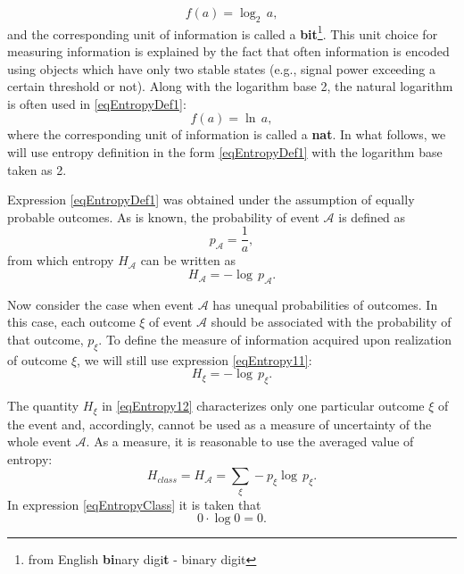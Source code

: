 \begin{equation}
f\left(a\right) = \log_2\,a,
\label{eqEntropyDefBit}
\end{equation}
and the corresponding unit of information is called a {\bf bit}\footnote{from
English {\bf bi}nary digi{\bf t} - binary digit}. This
unit choice for measuring information
is explained by the fact that often information is encoded using objects
which have only two stable states (e.g., signal power exceeding
a certain threshold or not). Along with the logarithm base 2, the natural logarithm is often used in \eqref{eqEntropyDef1}:
\begin{equation}
f\left(a\right) = \ln\,a,
\label{eqEntropyDefNat}
\end{equation}
where the corresponding unit of information is called a {\bf nat}. In
what follows, we will use entropy definition in the form
\eqref{eqEntropyDef1} with the logarithm base taken as 2.

Expression \eqref{eqEntropyDef1} was obtained under the assumption of
equally probable outcomes. As is known, the probability of event
$\mathcal{A}$ is defined as
\[
p_{\mathcal{A}} = \frac{1}{a},
\]
from which entropy $H_{\mathcal{A}}$ can be written as
\begin{equation}
H_{\mathcal{A}} = -\log \, p_{\mathcal{A}}.
\label{eqEntropy11}
\end{equation}

Now consider the case when event $\mathcal{A}$ has
unequal probabilities of outcomes. In this case, each outcome $\xi$ of event
$\mathcal{A}$ should be associated with the probability of that outcome,
$p_{\xi}$. To define the measure of information acquired upon realization of outcome $\xi$,
we will still use expression \eqref{eqEntropy11}:
\begin{equation}
H_{\xi} = -\log \, p_{\xi}.
\label{eqEntropy12}
\end{equation}

The quantity $H_{\xi}$ in \eqref{eqEntropy12} characterizes
only one particular outcome $\xi$ of the event and, accordingly, cannot be used as a measure of uncertainty of the whole event
$\mathcal{A}$. As a measure, it is reasonable to use the averaged
value of entropy:
\begin{equation}
H_{class} = H_{\mathcal{A}} = \sum_{\xi} - p_{\xi} \log \, p_{\xi}.
\label{eqEntropyClass}
\end{equation}
In expression \eqref{eqEntropyClass} it is taken that
\begin{equation}
0 \cdot \log 0 = 0.
\label{eqEntropyClassAdd}
\end{equation}

